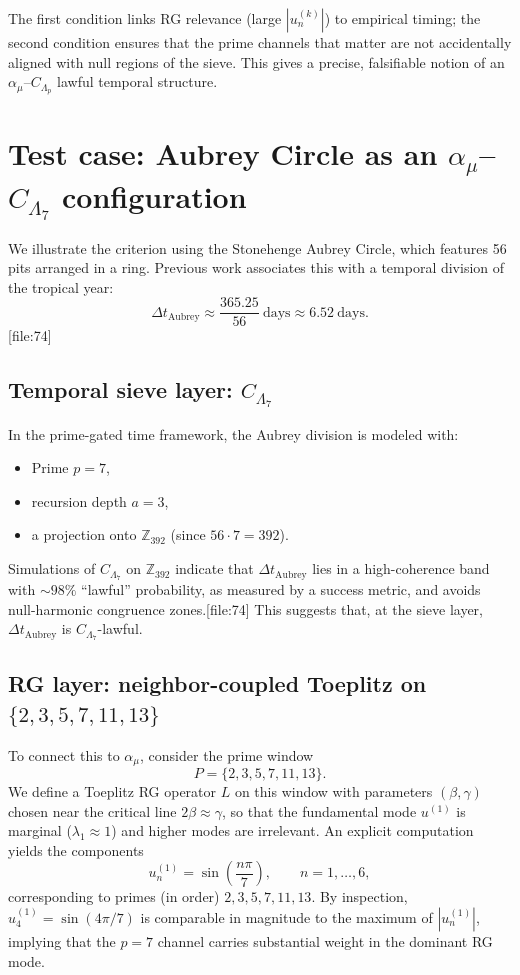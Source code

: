 \documentclass[11pt]{article}
\begin{document}
The first condition links RG relevance (large $|u^{(k)}_n|$) to empirical timing; the second condition ensures that the prime channels that matter are not accidentally aligned with null regions of the sieve.
This gives a precise, falsifiable notion of an $\alpha_\mu$--$C_{\Lambda_p}$ lawful temporal structure.

\section{Test case: Aubrey Circle as an $\alpha_\mu$--$C_{\Lambda_7}$ configuration}

We illustrate the criterion using the Stonehenge Aubrey Circle, which features 56 pits arranged in a ring.
Previous work associates this with a temporal division of the tropical year:
\begin{equation}
    \Delta t_{\mathrm{Aubrey}} \approx \frac{365.25}{56} \ \text{days} \approx 6.52 \ \text{days}.
\end{equation}[file:74]

\subsection{Temporal sieve layer: $C_{\Lambda_7}$}

In the prime-gated time framework, the Aubrey division is modeled with:
\begin{itemize}
    \item Prime $p = 7$,
    \item recursion depth $a = 3$,
    \item a projection onto $\mathbb{Z}_{392}$ (since $56 \cdot 7 = 392$).
\end{itemize}
Simulations of $C_{\Lambda_7}$ on $\mathbb{Z}_{392}$ indicate that $\Delta t_{\mathrm{Aubrey}}$ lies in a high-coherence band with $\sim 98\%$ ``lawful'' probability, as measured by a success metric, and avoids null-harmonic congruence zones.[file:74]
This suggests that, at the sieve layer, $\Delta t_{\mathrm{Aubrey}}$ is $C_{\Lambda_7}$-lawful.

\subsection{RG layer: neighbor-coupled Toeplitz on $\{2,3,5,7,11,13\}$}

To connect this to $\alpha_\mu$, consider the prime window
\[
    P = \{2,3,5,7,11,13\}.
\]
We define a Toeplitz RG operator $L$ on this window with parameters $(\beta,\gamma)$ chosen near the critical line $2\beta \approx \gamma$, so that the fundamental mode $u^{(1)}$ is marginal ($\lambda_1 \approx 1$) and higher modes are irrelevant.
An explicit computation yields the components
\begin{equation}
    u^{(1)}_n = \sin\left(\frac{n\pi}{7}\right), \qquad n=1,\dots,6,
\end{equation}
corresponding to primes (in order) $2,3,5,7,11,13$.
By inspection, $u^{(1)}_4 = \sin(4\pi/7)$ is comparable in magnitude to the maximum of $|u^{(1)}_n|$, implying that the $p=7$ channel carries substantial weight in the dominant RG mode.
\end{document}
